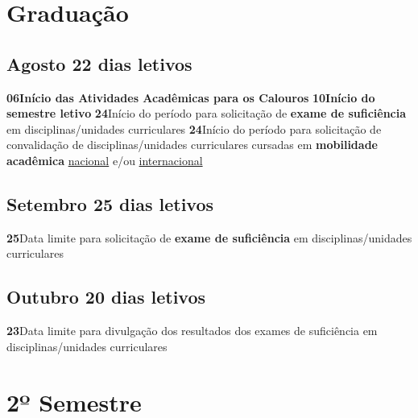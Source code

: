 \documentclass[thesis]{hmcposter}
\begin{document}
\begin{poster}
\section{\color{hmcorange}Graduação}\subsection{Agosto \hfill 22 dias letivos}\textbf{06}\qquad \textbf{Início das Atividades Acadêmicas para os Calouros} \newline \null\textbf{10}\qquad \textbf{Início do semestre letivo} \newline \null\textbf{24}\qquad Início do período para solicitação de \textbf{exame de suficiência} em disciplinas/unidades curriculares \newline \null\textbf{24}\qquad Início do período para solicitação de convalidação de disciplinas/unidades curriculares cursadas em \textbf{mobilidade acadêmica} \underline{nacional} e/ou \underline{internacional} \newline \null\subsection{Setembro \hfill 25 dias letivos}\textbf{25}\qquad Data limite para solicitação de \textbf{exame de suficiência} em disciplinas/unidades curriculares \newline \null\subsection{Outubro \hfill 20 dias letivos}\textbf{23}\qquad Data limite para divulgação dos resultados dos exames de suficiência em disciplinas/unidades curriculares \newline \null\vfill\null
\columnbreak
\section{\hfill \color{hmcorange}2º Semestre}

\end{poster}
\end{document}
